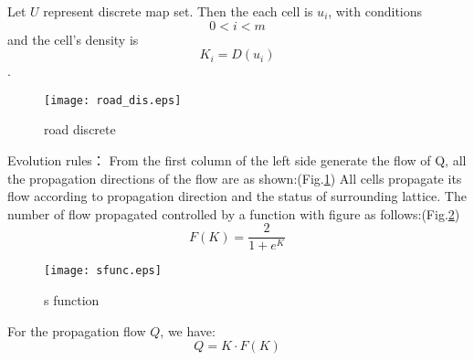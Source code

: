 \documentclass{mcmthesis}
\begin{document}
Let $U$ represent discrete map set. Then the each cell is $u_i$, with conditions 
$$0<i<m$$
and the cell's density is $$K_i=D(u_i)$$.
\begin{figure}[h]
\small
\centering
\texttt{[image: road\_dis.eps]}
\caption{\label{fig:road_dis}road discrete} 
\end{figure}

Evolution rules：
From the first column of the left side generate the flow of Q, all the propagation directions of the flow are as shown:(Fig.\ref{fig:road_dis})
All cells propagate its flow according to propagation direction and the status of surrounding lattice. The number of flow propagated controlled by a function with figure as follows:(Fig.\ref{fig:s_func})
\begin{equation}
F(K)=\frac{2}{1+e^{K}}
\label{eq:s_func}
\end{equation}
\begin{figure}[!htbp]
	\small
	\centering
	\texttt{[image: sfunc.eps]}
	\caption{\label{fig:s_func}s function} 
\end{figure}
For the propagation flow $Q$, we have: 
\begin{equation}
	\label{eq:q}
	Q=K \cdot F(K)
\end{equation}
\end{document}
